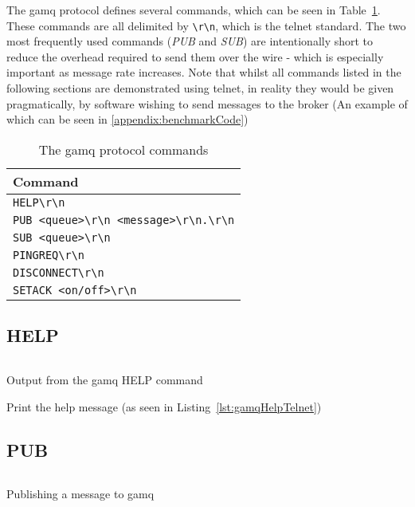 The gamq protocol defines several commands, which can be seen in
Table~\ref{tab:protocol}. These commands are all delimited by \verb|\r\n|, which
is the telnet standard. The two most frequently used commands (\emph{PUB} and
\emph{SUB}) are intentionally short to reduce the overhead required to send them
over the wire - which is especially important as message rate increases. Note
that whilst all commands listed in the following sections are demonstrated using
telnet, in reality they would be given pragmatically, by software wishing to
send messages to the broker (An example of which can be seen in
\ref{appendix:benchmarkCode})

\begin{table}[H]
\centering
\caption{The gamq protocol commands}
\label{tab:protocol}
\begin{tabular}{|l|}
\hline
Command \\ \hline
\verb|HELP\r\n|                           \\
\verb|PUB <queue>\r\n <message>\r\n.\r\n| \\
\verb|SUB <queue>\r\n|                    \\
\verb|PINGREQ\r\n|                        \\
\verb|DISCONNECT\r\n|                     \\
\verb|SETACK <on/off>\r\n|                \\ \hline
\end{tabular}
\end{table}

\subsection{HELP}
\label{sub:helpCommand}

\begin{listing}[H]
  \centering
  \inputminted{bash}{code/gamqHelpOutputTelnet}
  \caption{Output from the gamq HELP command}
  \label{lst:gamqHelpTelnet}
\end{listing}

Print the help message (as seen in Listing~\ref{lst:gamqHelpTelnet})

\subsection{PUB}
\label{sub:pubCommand}

\begin{listing}[H]
  \centering
  \inputminted{bash}{code/gamqPubOutput}
  \caption{Publishing a message to gamq}
  \label{lst:gamqPubTelnet}
\end{listing}

